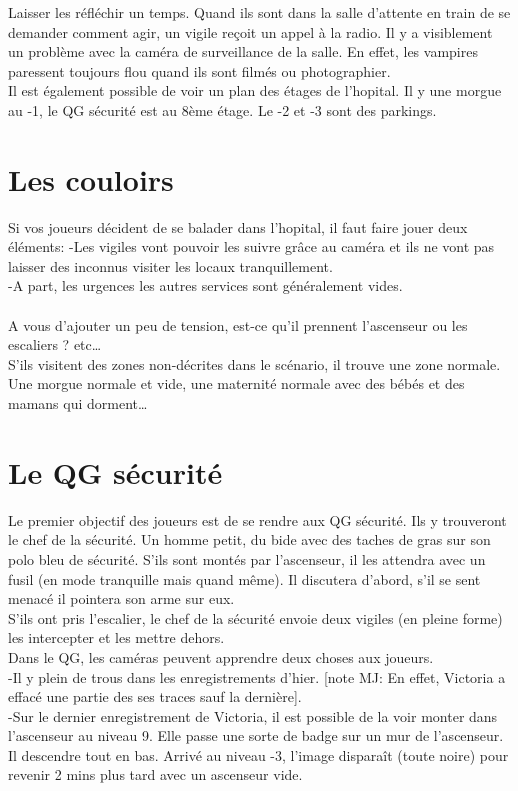 \documentclass[oneside,12pt]{book}
\begin{document}
\begin{flushleft}
\vspace{0.5cm}
Laisser les réfléchir un temps. Quand ils sont dans la salle d'attente en train de se demander comment agir, un vigile reçoit un appel à la radio. Il y a visiblement un problème avec la caméra de surveillance de la salle. En effet, les vampires paressent toujours flou quand ils sont filmés ou photographier. \\
Il est également possible de voir un plan des étages de l'hopital. Il y une morgue au -1, le QG sécurité est au 8ème étage. Le -2 et -3 sont des parkings. \\
\vspace{0.5cm}

\section{Les couloirs}
Si vos joueurs décident de se balader dans l'hopital, il faut faire jouer deux éléments:
-Les vigiles vont pouvoir les suivre grâce au caméra et ils ne vont pas laisser des inconnus visiter les locaux tranquillement.\\
-A part, les urgences les autres services sont généralement vides.\\
\\
\vspace{0.5cm}
A vous d'ajouter un peu de tension, est-ce qu'il prennent l'ascenseur ou les escaliers ? etc…\\
S'ils visitent des zones non-décrites dans le scénario, il trouve une zone normale. Une morgue normale et vide, une maternité normale avec des bébés et des mamans qui dorment…

\section{Le QG sécurité}
Le premier objectif des joueurs est de se rendre aux QG sécurité. Ils y trouveront le chef de la sécurité. Un homme petit, du bide avec des taches de gras sur son polo bleu de sécurité. S'ils sont montés par l'ascenseur, il les attendra avec un fusil (en mode tranquille mais quand même). Il discutera d'abord, s'il se sent menacé il pointera son arme sur eux. \\ S'ils ont pris l'escalier, le chef de la sécurité envoie deux vigiles (en pleine forme) les intercepter et les mettre dehors.\\


\vspace{0.5cm}
Dans le QG, les caméras peuvent apprendre deux choses aux joueurs.\\
-Il y plein de trous dans les enregistrements d'hier. [note MJ: En effet, Victoria a effacé une partie des ses traces sauf la dernière].\\
-Sur le dernier enregistrement de Victoria, il est possible de la voir monter dans l'ascenseur au niveau 9. Elle passe une sorte de badge sur un mur de l'ascenseur. Il descendre tout en bas. Arrivé au niveau -3, l'image disparaît (toute noire) pour revenir 2 mins plus tard avec un ascenseur vide. \\



\end{flushleft}
\end{document}
